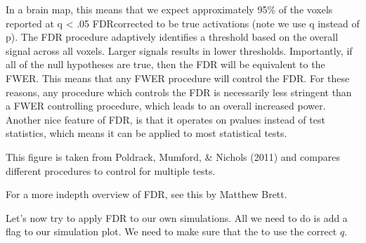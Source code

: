 \documentclass[letterpaper,10pt,english]{sphinxmanual}
\begin{document}
In a brain map, this means that we expect approximately 95\% of the voxels reported at q \textless{} .05 FDR\sphinxhyphen{}corrected to be true activations (note we use q instead of p). The FDR procedure adaptively identifies a threshold based on the overall signal across all voxels. Larger signals results in lower thresholds. Importantly, if all of the null hypotheses are true, then the FDR will be equivalent to the FWER. This means that any FWER procedure will  control the FDR. For these reasons, any procedure which controls the FDR is necessarily less stringent than a FWER controlling procedure, which leads to an overall increased power. Another nice feature of FDR, is that it operates on p\sphinxhyphen{}values instead of test statistics, which means it can be applied to most statistical tests.

This figure is taken from Poldrack, Mumford, \& Nichols (2011) and compares different procedures to control for multiple tests.

For a more indepth overview of FDR, see this  by Matthew Brett.

Let’s now try to apply FDR to our own simulations. All we need to do is add a  flag to our simulation plot. We need to make sure that the  to use the correct \(q\).

\begin{sphinxVerbatim}[commandchars=\\\{\}]
  
  
  
     
   
\end{sphinxVerbatim}
\end{document}
